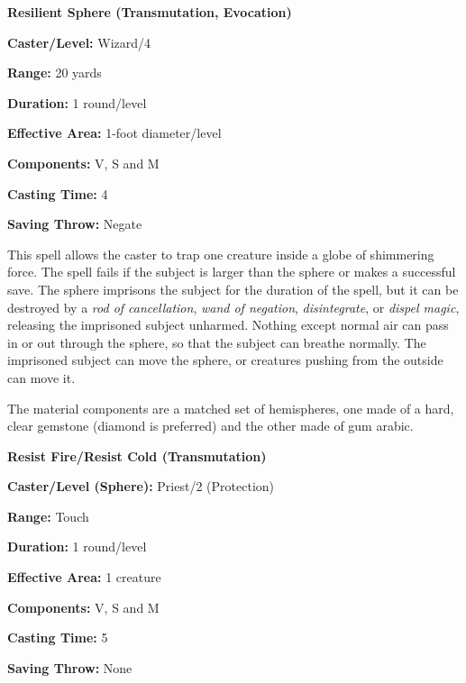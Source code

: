 \begin{multicols}{2}
\noindent
\begin{minipage}{\columnwidth}

\noindent \textbf{Resilient Sphere (Transmutation, Evocation)}

\noindent \textbf{Caster/Level:} Wizard/4

\noindent \textbf{Range:} 20 yards

\noindent \textbf{Duration:} 1 round/level

\noindent \textbf{Effective Area:} 1-foot diameter/level

\noindent \textbf{Components:} V, S and M

\noindent \textbf{Casting Time:} 4

\noindent \textbf{Saving Throw:} Negate

\end{minipage}

This spell allows the caster to trap one creature inside a globe of shimmering force.  The spell fails if the subject is larger than the sphere or makes a successful save.  The sphere imprisons the subject for the duration of the spell, but it can be destroyed by a \textit{rod of cancellation}, \textit{wand of negation}, \textit{disintegrate}, or \textit{dispel magic}, releasing the imprisoned subject unharmed.  Nothing except normal air can pass in or out through the sphere, so that the subject can breathe normally.  The imprisoned subject can move the sphere, or creatures pushing from the outside can move it.

The material components are a matched set of hemispheres, one made of a hard, clear gemstone (diamond is preferred) and the other made of gum arabic.

\vspace{1em}

\noindent
\begin{minipage}{\columnwidth}

\noindent \textbf{Resist Fire/Resist Cold (Transmutation)}

\noindent \textbf{Caster/Level (Sphere):} Priest/2 (Protection)

\noindent \textbf{Range:} Touch

\noindent \textbf{Duration:} 1 round/level

\noindent \textbf{Effective Area:} 1 creature

\noindent \textbf{Components:} V, S and M

\noindent \textbf{Casting Time:} 5

\noindent \textbf{Saving Throw:} None


\end{minipage}
\end{multicols}
